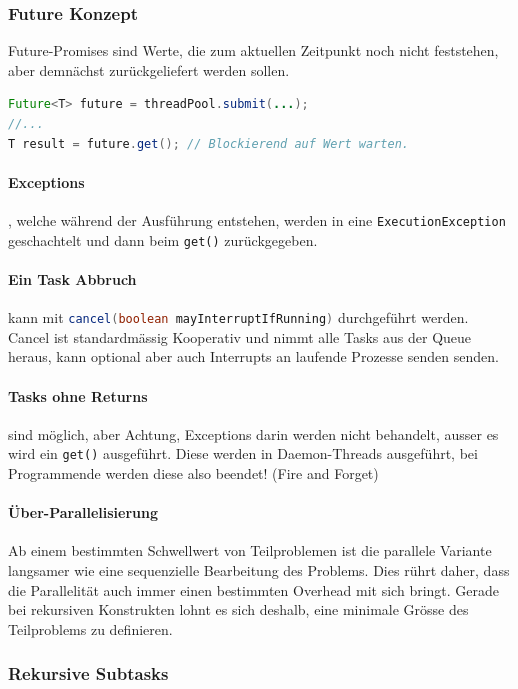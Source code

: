 \subsubsection{Future Konzept}

Future-Promises sind Werte, die zum aktuellen Zeitpunkt noch nicht feststehen, aber demnächst zurückgeliefert werden sollen.

\begin{lstlisting}[language=java]
Future<T> future = threadPool.submit(...);
//...
T result = future.get(); // Blockierend auf Wert warten.
\end{lstlisting}

\paragraph{Exceptions}, welche während der Ausführung entstehen, werden in eine \lstinline|ExecutionException| geschachtelt und dann beim \lstinline|get()| zurückgegeben.

\paragraph{Ein Task Abbruch} kann mit \lstinline[language=java]|cancel(boolean mayInterruptIfRunning)| durchgeführt werden. Cancel ist standardmässig Kooperativ und nimmt alle Tasks aus der Queue heraus, kann optional aber auch Interrupts an laufende Prozesse senden senden.

\paragraph{Tasks ohne Returns} sind möglich, aber Achtung, Exceptions darin werden nicht behandelt, ausser es wird ein \lstinline|get()| ausgeführt. Diese werden in Daemon-Threads ausgeführt, bei Programmende werden diese also beendet! (Fire and Forget)

\paragraph{Über-Parallelisierung} Ab einem bestimmten Schwellwert von Teilproblemen ist die parallele Variante langsamer wie eine sequenzielle Bearbeitung des Problems. Dies rührt daher, dass die Parallelität auch immer einen bestimmten Overhead mit sich bringt. Gerade bei rekursiven Konstrukten lohnt es sich deshalb, eine minimale Grösse des Teilproblems zu definieren.

\subsubsection{Rekursive Subtasks}

